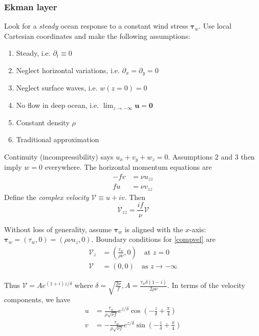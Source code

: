 \documentclass{jknotes}
\begin{document}
\subsubsection{Ekman layer}
Look for a \emph{steady} ocean response to a constant wind stress
$\symbf{\tau}_w$. Use local Cartesian coordinates and make the following assumptions:
\begin{enumerate}
	\item Steady, i.e. $\partial_t \equiv 0$
	\item Neglect horizontal variations, i.e. $\partial_x = \partial_y = 0$
	\item Neglect surface waves, i.e. $w(z=0) = 0$
	\item No flow in deep ocean, i.e. $\lim_{z \to -\infty} \symbf{u} = \symbf{0}$
	\item Constant density $\rho$
	\item Traditional approximation
\end{enumerate}

Continuity (incompressibility) says $u_x + v_y + w_z = 0$. Assumptions $2$ and
$3$ then imply $w = 0$ everywhere. The horizontal momentum equations are
\begin{align}
	-fv &= \nu u_{zz} \label{hmom1} \\
	fu &= \nu v_{zz} \label{hmom2}
\end{align}
Define the \emph{complex velocity} $\mathcal{V} \equiv u+iv$. Then
\begin{equation}
	\mathcal{V}_{zz} = \frac{if}{\nu} \mathcal{V} \label{compvel}
\end{equation}

Without loss of generality, assume $\symbf{\tau}_w$ is aligned with the $x$-axis:
$\symbf{\tau}_w = (\tau_w, 0) = (\rho \nu u_z, 0)$. Boundary conditions for
\eqref{compvel} are
\begin{equation}
	\begin{aligned}
		\mathcal{V}_z &= \left( \frac{\tau_w}{\rho \nu}, 0\right) \hspace{1em}
		\text{at} \, \, z = 0 \\
		\mathcal{V} &= (0,0) \hspace{1em} \text{as}\,\, z \to -\infty
	\end{aligned}
\end{equation}

Thus $\mathcal{V} = Ae^{(1+i)z/\delta}$ where $\delta = \sqrt{\frac{2\nu}{f}},
A = \frac{\tau_w \delta (1-i)}{2 \rho \nu}$. In terms of the velocity
components, we have
\begin{equation}
	\begin{aligned}
		u &= \frac{\tau_w}{\rho \sqrt{\nu f}} e^{z/\delta} \cos \left(
		-\frac{z}{\delta} + \frac{\pi}{4}\right) \\
		v &= -\frac{\tau_w}{\rho \sqrt{\nu f}} e^{z/\delta} \sin \left(
		-\frac{z}{\delta} + \frac{\pi}{4}\right) \\
	\end{aligned}
\end{equation}
\end{document}
